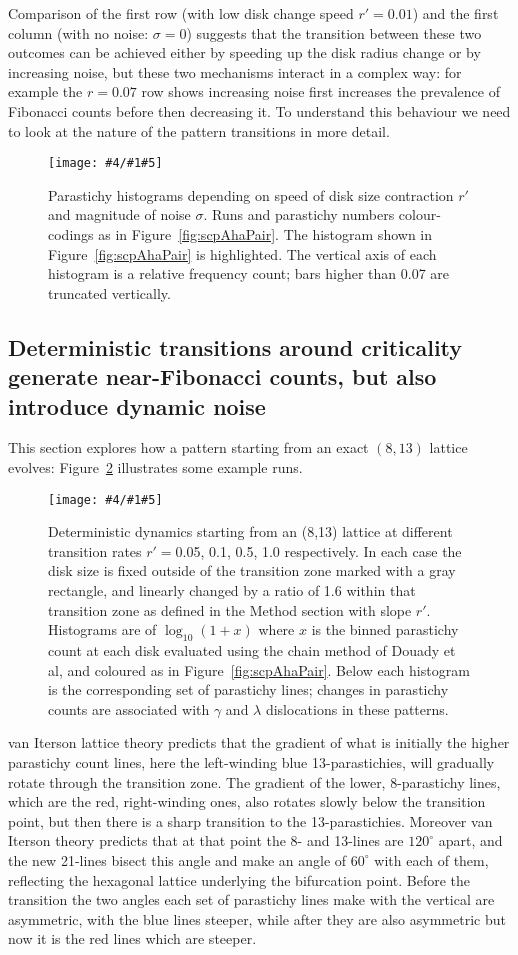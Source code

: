\documentclass[a4paper,10pt]{amsart}
\newlength{\jfigwidth}
\newcommand{\pdffig}[3]{\jdofig{#1}{#2}{#3}{Figures}{.pdf}}
\newcommand{\jdofig}[5]{
	\begin{figure}\centering\texttt{[image: \#4/\#1\#5]} \caption{#2}\label{fig:#1}\end{figure}
}
\begin{document}
Comparison of the first row (with low disk change speed $r'=0.01$) and the first column (with no noise: $\sigma=0$) suggests that the transition between these two outcomes can be achieved either by speeding up the disk radius change or by increasing noise, but these two mechanisms interact in a complex way: for example the $r=0.07$ row shows increasing noise first increases the prevalence of Fibonacci counts before then decreasing it. To understand this behaviour we need to look at the nature of the pattern transitions in more detail.

\pdffig{scpTo55}{Parastichy histograms depending on speed of disk size contraction $r'$ and magnitude of noise $\sigma$.  Runs and parastichy numbers colour-codings as in Figure~\ref{fig:scpAhaPair}. The histogram shown in Figure~\ref{fig:scpAhaPair} is highlighted. The vertical axis of each histogram is a relative frequency count; bars higher than 0.07 are truncated vertically.}{1}

 \clearpage
\subsection{Deterministic transitions around criticality generate near-Fibonacci counts, but also introduce dynamic noise}

This section explores how a pattern starting from an exact $(8,13)$ lattice evolves: Figure~\ref{fig:scpDet813} illustrates some example runs.
 \pdffig{scpDet813}{Deterministic dynamics starting from an (8,13) lattice at different transition rates $r'=$0.05, 0.1, 0.5, 1.0 respectively. In each case the disk size is fixed outside of the transition zone marked with a gray rectangle, and linearly changed by a ratio of 1.6 within that transition zone as defined in the Method section with slope $r'$.  Histograms are of $\log_{10} (1+x) $ where $x$ is the binned parastichy count at each disk evaluated using the chain method of Douady et al, and coloured as in Figure~\ref{fig:scpAhaPair}. Below each histogram is the corresponding set of parastichy lines; changes in parastichy counts are associated with $\gamma$ and $\lambda$ dislocations in these patterns.}{.9}
%
 van Iterson lattice theory predicts that the gradient of what is initially the higher parastichy count lines, here the left-winding blue 13-parastichies, will gradually rotate through the transition zone. The gradient of the lower, 8-parastichy lines, which are the red, right-winding ones, also rotates slowly below the transition point, but then there is a sharp transition to the 13-parastichies. Moreover  van Iterson theory predicts that at that point the 8- and 13-lines are $120^{\circ}$ apart, and the new 21-lines bisect this angle and make an angle of $60^\circ$ with each of them, reflecting the hexagonal lattice underlying the bifurcation point. Before the transition the two angles each set of parastichy lines make with the vertical are asymmetric, with the blue lines steeper, while after they are also asymmetric but now it is the red lines which are steeper.
 
\end{document}
